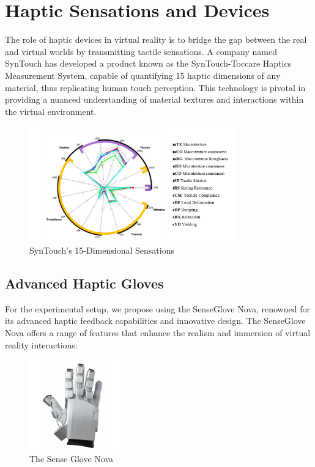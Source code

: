 \section{Haptic Sensations and Devices}
\label{sec:HapticSensationsDevices}

The role of haptic devices in virtual reality is to bridge the gap between the real and virtual worlds by transmitting tactile sensations. A company named SynTouch has developed a product known as the SynTouch-Toccare Haptics Measurement System, capable of quantifying 15 haptic dimensions of any material, thus replicating human touch perception. This technology is pivotal in providing a nuanced understanding of material textures and interactions within the virtual environment.
\begin{figure}[ht]
  \centering
  \includegraphics[width=0.8\textwidth]{Development/senstations.PNG}
  \caption{SynTouch's 15-Dimensional Sensations \cite{quantifying_touch}}
  \label{fig:sensations}
\end{figure}

\subsection{Advanced Haptic Gloves}
\label{subsec:AdvancedHapticGloves}

For the experimental setup, we propose using the SenseGlove Nova, renowned for its advanced haptic feedback capabilities and innovative design. The SenseGlove Nova offers a range of features that enhance the realism and immersion of virtual reality interactions:

\begin{figure}[ht]
\centering
\includegraphics[width=0.35\textwidth]{Development/sense-glove-nova-set.jpg}
\caption{The Sense Glove Nova \cite{senseglove_nova}}
\label{fig: The Sense Glove Nova}
\end{figure}

